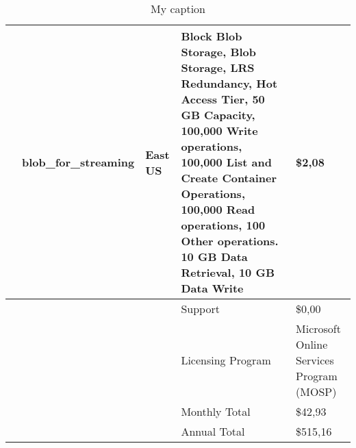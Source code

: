\begin{table}[]
\begin{tabular}{lllll}
    \cellcolor[HTML]{9B9B9B}{\color[HTML]{000000} \textbf{Storage}}                  & blob\_for\_streaming                        & East US                                & Block Blob Storage, Blob Storage, LRS Redundancy, Hot Access Tier, 50 GB Capacity, 100,000 Write operations, 100,000 List and Create Container Operations, 100,000 Read operations, 100 Other operations. 10 GB Data Retrieval, 10 GB Data Write & \$2,08                                         \\ \hline
    \cellcolor[HTML]{9B9B9B}{\color[HTML]{000000} \textbf{Support}}                  &                                             &                                        & Support                                                                                                                                                                                                                                          & \$0,00                                         \\ \hline
                                                                                     &                                             &                                        & Licensing Program                                                                                                                                                                                                                                & Microsoft Online Services Program (MOSP)       \\ \hline
                                                                                     &                                             &                                        & Monthly Total                                                                                                                                                                                                                                    & \$42,93                                        \\ \hline
                                                                                     &                                             &                                        & Annual Total                                                                                                                                                                                                                                     & \$515,16                                       \\ \hline
    \end{tabular}
    \caption{My caption}
    \label{my-label}
    \end{table}